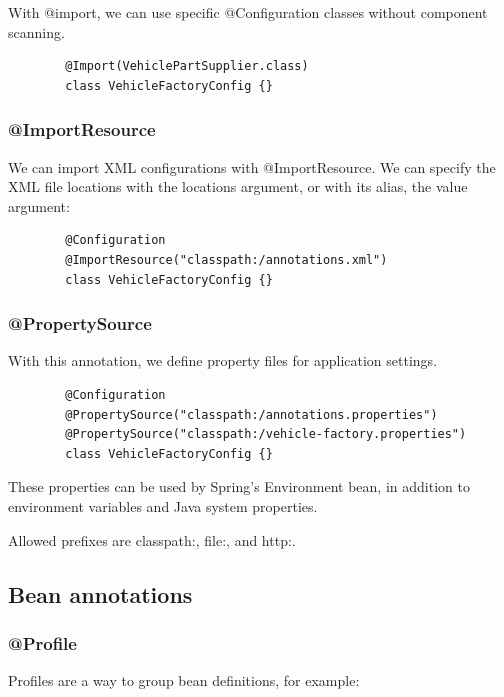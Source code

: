 \documentclass{scrartcl}
\begin{document}
    With @import, we can use specific @Configuration classes without component scanning.

    \begin{lstlisting}
        @Import(VehiclePartSupplier.class)
        class VehicleFactoryConfig {}
    \end{lstlisting}

\subsubsection{@ImportResource}

    We can import XML configurations with @ImportResource. We can specify the XML file locations with the locations argument, or with its alias, the value argument:

    \begin{lstlisting}
        @Configuration
        @ImportResource("classpath:/annotations.xml")
        class VehicleFactoryConfig {}
    \end{lstlisting}

\subsubsection{@PropertySource}

    With this annotation, we define property files for application settings.

    \begin{lstlisting}
        @Configuration
        @PropertySource("classpath:/annotations.properties")
        @PropertySource("classpath:/vehicle-factory.properties")
        class VehicleFactoryConfig {}
    \end{lstlisting}

    These properties can be used by Spring's Environment bean, in addition to environment variables and Java system properties.

    Allowed prefixes are classpath:, file:, and http:.

\subsection{Bean annotations}

\subsubsection{@Profile}

    Profiles are a way to group bean definitions, for example:
\end{document}
